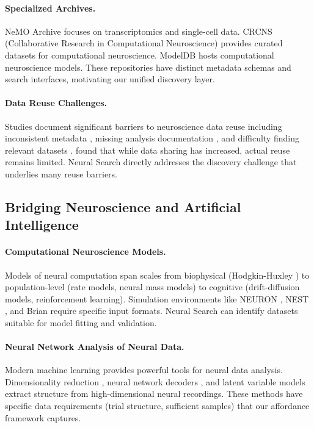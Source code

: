 \documentclass{article}
\theoremstyle{definition}
\begin{document}
\paragraph{Specialized Archives.} NeMO Archive \citep{nemo2023archive} focuses on transcriptomics and single-cell data. CRCNS (Collaborative Research in Computational Neuroscience) \citep{teeters2008crcns} provides curated datasets for computational neuroscience. ModelDB \citep{hines2004modeldb} hosts computational neuroscience models. These repositories have distinct metadata schemas and search interfaces, motivating our unified discovery layer.

\paragraph{Data Reuse Challenges.} Studies document significant barriers to neuroscience data reuse including inconsistent metadata \citep{gleeson2019systematic}, missing analysis documentation \citep{soska2021data}, and difficulty finding relevant datasets \citep{ferguson2014big}. \citet{tenopir2020data} found that while data sharing has increased, actual reuse remains limited. Neural Search directly addresses the discovery challenge that underlies many reuse barriers.

\subsection{Bridging Neuroscience and Artificial Intelligence}

\paragraph{Computational Neuroscience Models.} Models of neural computation span scales from biophysical (Hodgkin-Huxley \citep{hodgkin1952quantitative}) to population-level (rate models, neural mass models) to cognitive (drift-diffusion models, reinforcement learning). Simulation environments like NEURON \citep{hines1997neuron}, NEST \citep{gewaltig2007nest}, and Brian \citep{stimberg2019brian} require specific input formats. Neural Search can identify datasets suitable for model fitting and validation.

\paragraph{Neural Network Analysis of Neural Data.} Modern machine learning provides powerful tools for neural data analysis. Dimensionality reduction \citep{cunningham2014dimensionality}, neural network decoders \citep{glaser2020machine}, and latent variable models \citep{pandarinath2018inferring} extract structure from high-dimensional neural recordings. These methods have specific data requirements (trial structure, sufficient samples) that our affordance framework captures.
\end{document}
